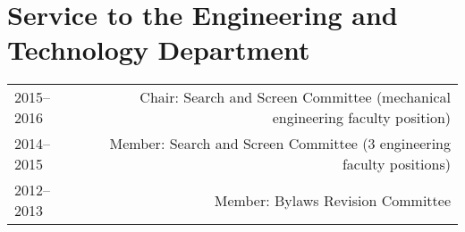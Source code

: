 \section*{Service to the Engineering and Technology Department}
\begin{tabular}{L!{\VRule}R}
2015--2016&Chair: Search and Screen Committee (mechanical engineering faculty position)\\
2014--2015&Member: Search and Screen Committee (3 engineering faculty positions)\\
2012--2013&Member: Bylaws Revision Committee\\
\end{tabular}